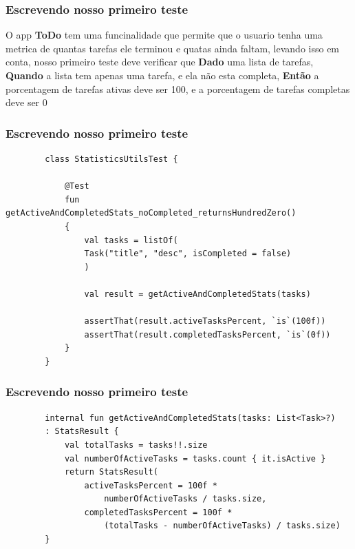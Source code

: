 \documentclass{beamer}
\begin{document}
\begin{frame}
	\frametitle{Escrevendo nosso primeiro teste}
	O app \textbf{ToDo} tem uma funcinalidade que permite que o usuario tenha uma metrica de quantas tarefas ele terminou e quatas ainda faltam, levando isso em conta, nosso primeiro teste deve verificar que \textbf{Dado} uma lista de tarefas, \textbf{Quando} a lista tem  apenas uma tarefa, e ela não esta completa, \textbf{Então} a porcentagem de tarefas ativas deve ser 100, e a porcentagem de tarefas completas deve ser 0
\end{frame}

\begin{frame}[fragile]
	\frametitle{Escrevendo nosso primeiro teste}
		\begin{example}
		\begin{lstlisting}
		class StatisticsUtilsTest {
		
			@Test
			fun getActiveAndCompletedStats_noCompleted_returnsHundredZero() 
			{
				val tasks = listOf(
				Task("title", "desc", isCompleted = false)
				)
				
				val result = getActiveAndCompletedStats(tasks)
				
				assertThat(result.activeTasksPercent, `is`(100f))
				assertThat(result.completedTasksPercent, `is`(0f))
			}
		}
		\end{lstlisting}
	\end{example}
	
\end{frame}

\begin{frame}[fragile]
	\frametitle{Escrevendo nosso primeiro teste}
	\begin{example}
		\begin{lstlisting}
		internal fun getActiveAndCompletedStats(tasks: List<Task>?)
		: StatsResult {
			val totalTasks = tasks!!.size
			val numberOfActiveTasks = tasks.count { it.isActive }
			return StatsResult(
				activeTasksPercent = 100f * 
					numberOfActiveTasks / tasks.size,
				completedTasksPercent = 100f * 
					(totalTasks - numberOfActiveTasks) / tasks.size)
		}
		\end{lstlisting}
	\end{example}
	
\end{frame}
\end{document}
